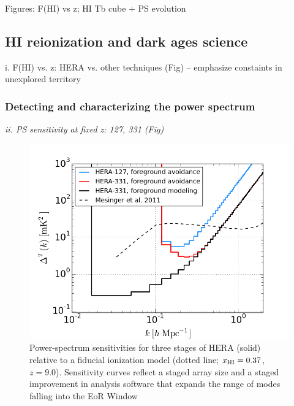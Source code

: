 \documentclass[preprint]{aastex}
\def\HI{{H{\small I }}}
\def\xHI{{x_{\rm\HI}}}
\begin{document}
Figures: F(HI) vs z;  HI Tb cube + PS evolution


\subsection{HI reionization and dark ages science} %

i. F(HI) vs. z: HERA vs. other techniques (Fig) -- emphasize constaints in unexplored territory


\subsubsection{Detecting and characterizing the power spectrum}
\emph{ii. PS sensitivity at fixed z: 127, 331 (Fig)}
\begin{figure}[t]\centering
\includegraphics[width=\textwidth]{plots/Pspec/eor_pspec_2014.png}
\caption{Power-spectrum sensitivities for three stages of
HERA (solid) relative to a fiducial ionization model (dotted line; $\xHI=0.37$, $z=9.0$).  
Sensitivity curves reflect a staged array size and
a staged improvement in analysis software that expands the range
of modes falling into the EoR Window \label{fig:PspecSensitivity}}
\end{figure}
\end{document}
